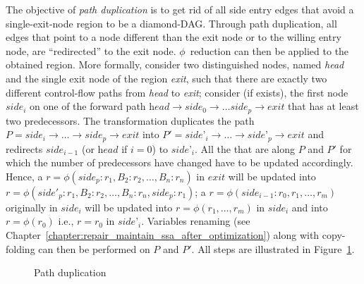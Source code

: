 The objective of \emph{path duplication} is to get rid of all side entry edges that avoid a single-exit-node region to be a diamond-DAG. 
Through path duplication, all edges that point to a node different than the exit node or to the willing entry node, are ``redirected'' to the exit node. 
$\phi$~reduction can then be applied to the obtained region. 
More formally, consider two distinguished nodes, named \textit{head} and the single exit node of the region \textit{exit}, such that there are exactly two different control-flow paths from \textit{head} to \textit{exit}; 
consider (if exists), the first node $\textit{side}_i$ on one of the forward path $\textit{head}\rightarrow \textit{side}_0\rightarrow\dots\textit{side}_p\rightarrow\textit{exit}$ that has at least two predecessors. 
The transformation duplicates the path $P=\textit{side}_i\rightarrow\dots\rightarrow\textit{side}_p\rightarrow\textit{exit}$ into $P'=\textit{side'}_i\rightarrow\dots\rightarrow\textit{side'}_p\rightarrow\textit{exit}$ and redirects $\textit{side}_{i-1}$ (or $\textit{head}$ if $i=0$) to $\textit{side'}_i$. 
All the \phifuns that are along $P$ and $P'$ for which the number of predecessors have changed have to be updated accordingly. 
Hence, a $r=\phi(\textit{side}_p:r_1,B_2:r_2,\dots,B_n:r_n)$ in $\textit{exit}$ will be updated into $r=\phi(\textit{side}'_p:r_1,B_2:r_2,\dots,B_n:r_n,\textit{side}_p:r_1)$; 
a $r=\phi(\textit{side}_{i-1}:r_0, r_1, \dots, r_m)$ originally in $\textit{side}_i$ will be updated into $r=\phi(r_1, \dots, r_m)$ in $\textit{side}_i$ and into $r=\phi(r_0)$ i.e., $r=r_0$ in $\textit{side'}_i$. 
Variables renaming (see Chapter~\ref{chapter:repair_maintain_ssa_after_optimization}) along with copy-folding can then be performed on $P$ and $P'$. 
All steps are illustrated in Figure~\ref{fig:phi_aug}.


\begin{figure}[h]

  \caption{\label{fig:phi_aug}Path duplication}
\end{figure}


